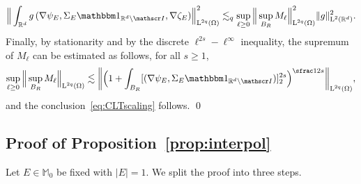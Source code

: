 \documentclass[JEP,XML,SOM,Unicode,published]{cedram}
\let\mathcal\mathscr
\let\mathds\mathbbm
\theoremstyle{plain}
\theoremstyle{definition}
\newcommand{\R}{\mathbb R}
\newcommand{\Ic}{\mathcal I}
\newcommand{\Md}{\mathbb M}
\newcommand{\Ld}{\operatorname{L}}
\begin{document}
\begin{equation*}
\Big\|\int_{\R^d}g\,(\nabla \psi_E,\Sigma_E\mathds1_{\R^d\setminus\Ic},\nabla\zeta_E)\Big\|_{\Ld^{2q}(\Omega)}^{2}
\lesssim_q \sup_{\ell\ge0}\Big\|\sup_{B_R}M_\ell\Big\|_{\Ld^{2q}(\Omega)}^2\| g\|_{\Ld^2(\R^d)}^2.
\end{equation*}
Finally, by stationarity and by the discrete $\ell^{2s}-\ell^\infty$ inequality, the supremum of $M_\ell$ can be estimated as follows, for all $s\ge1$,
\begin{equation*}
\sup_{\ell\ge0}\Big\|\sup_{B_R}M_\ell\Big\|_{\Ld^{2q}(\Omega)}\lesssim \bigg\|\Big(1+\int_{B_{R}}[(\nabla\psi_E,\Sigma_E\mathds1_{\R^d\setminus\Ic})]_2^{2s}\Big)^{\sfrac1{2s}}\bigg\|_{\Ld^{2q}(\Omega)},
\end{equation*}
and the conclusion~\eqref{eq:CLTscaling} follows.
\qed

\subsection{Proof of Proposition~\ref{prop:interpol}}
Let $E\in\Md_0$ be fixed with $|E|=1$.
We split the proof into three steps.
\end{document}
